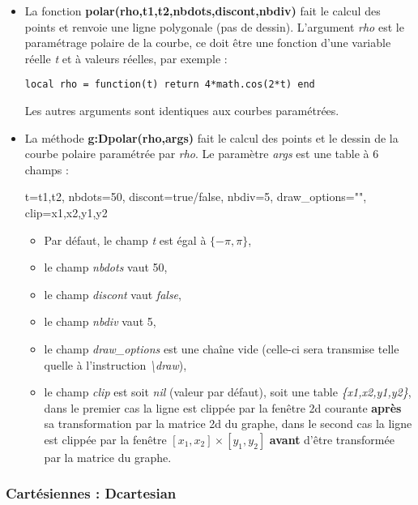 \begin{itemize}
\item La fonction \textbf{polar(rho,t1,t2,nbdots,discont,nbdiv)} fait le calcul des points et renvoie une ligne polygonale (pas de dessin). L'argument \emph{rho} est le paramétrage polaire de la courbe, ce doit être une fonction d'une variable réelle \emph{t} et à valeurs
  réelles, par exemple :

    \texttt{local rho = function(t) return 4*math.cos(2*t) end}

    Les autres arguments sont identiques aux courbes paramétrées.
\item La méthode \textbf{g:Dpolar(rho,args)} fait le calcul des points et le  dessin de la courbe polaire paramétrée par \emph{rho}.  Le paramètre \emph{args} est une table à 6 champs :

\begin{TeXcode}
  { t={t1,t2}, nbdots=50, discont=true/false, nbdiv=5, draw_options="", clip={x1,x2,y1,y2} }
\end{TeXcode}

  \begin{itemize}
      \item Par défaut, le champ \emph{t} est égal à $\{-\pi,\pi\}$,
      \item le champ \emph{nbdots} vaut 50,
      \item le champ \emph{discont} vaut \emph{false}, 
      \item le champ \emph{nbdiv} vaut 5, 
      \item le champ \emph{draw\_options} est une chaîne vide (celle-ci sera transmise telle quelle à l'instruction \emph{\textbackslash draw}),
      \item le champ \emph{clip} est soit \emph{nil} (valeur par défaut), soit une table \emph{\{x1,x2,y1,y2\}}, dans le premier cas la ligne est clippée par la fenêtre 2d courante \textbf{après} sa transformation par la matrice 2d du graphe, dans le second cas la ligne est clippée par la fenêtre $[x_1,x_2]\times[y_1,y_2]$ \textbf{avant} d'être transformée par la matrice du graphe.
  \end{itemize}
\end{itemize}

\subsubsection{Cartésiennes : Dcartesian}

